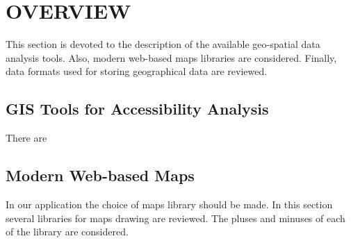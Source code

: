 \section{OVERVIEW}

This section is devoted to the description of the available geo-spatial data analysis tools. Also,
modern web-based maps libraries are considered. Finally, data formats used for storing geographical
data are reviewed.

\subsection{GIS Tools for Accessibility Analysis}

There are

\subsection{Modern Web-based Maps}
In our application the choice of maps library should be made. In this section several
libraries for maps drawing are reviewed. The pluses and minuses of each of the
library are considered.

